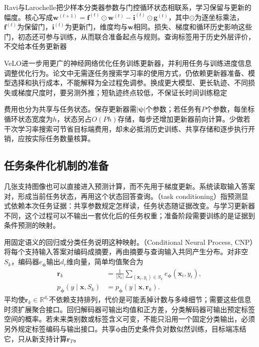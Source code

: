 Ravi与Larochelle把少样本分类器参数与门控循环状态相联系，学习保留与更新的幅度。核心写成$\bm w^{(t+1)}=\bm f^{(t)}\odot\bm w^{(t)}-\bm i^{(t)}\odot\bm g^{(t)}$，其中$\odot$为逐坐标乘法，$\bm f^{(t)}$为保留门，$\bm i^{(t)}$为更新门，维度均与$\bm w$相同。损失、梯度和循环历史影响这些门，初态还可参与训练，从而联合准备起点与规则。查询标签用于历史外层评价，不交给本任务更新器

VeLO进一步用更广的神经网络优化任务训练更新器，并利用任务与训练进度信息调整优化行为。论文中无需逐任务搜索学习率的使用方式，仍依赖更新器准备、模型选择和执行成本，不能解释为全过程免调参。换成更大模型、更长轨迹、不同损失或梯度尺度时，要另测外推；短轨迹终点较低，不保证长时间训练稳定

费用也分为共享与任务状态。保存更新器需$|\bm\psi|$个参数；若任务有$P$个参数，每坐标循环状态宽度为$h$，状态另占$O(Ph)$存储，每步还增加更新器前向计算。少做若干次学习率搜索可节省目标端费用，却未必抵消历史训练、共享存储和逐步执行开销，应按实际任务数量核算。

\subsection{任务条件化机制的准备}
\label{sec:ket-transfer-conditioning-preparation}

几张支持图像也可以直接进入预测计算，而不先用于梯度更新。系统读取输入答案对，形成当前任务状态，再用这个状态回答查询。（task conditioning）指预测显式依赖本次任务证据：共享参数规定怎样读，任务状态随证据改变。与学习更新器不同，这个过程可以不输出一套优化后的任务权重；准备阶段需要训练的是证据到条件预测的映射。

用固定语义的回归或分类任务说明这种映射。（Conditional Neural Process, CNP）将每个支持输入答案对编码成摘要，再由摘要与查询输入共同产生分布。对非空$S_k$，编码器$e_{\bm\phi}$输出$d_r$维向量，简单均值聚合为
\begin{align}
  \bm r_k&=\frac1{|S_k|}\sum_{(\bm x_i,y_i)\in S_k}
                   e_{\bm\phi}(\bm x_i,y_i), \nonumber\\
  p_{\bm\phi}(y\mid\bm x,S_k)
      &=p_{\bm\phi}(y\mid\bm x,\bm r_k).
  \label{eq:ket-transfer-cnp}
\end{align}
平均使$\bm r_k\in\mathbb R^{d_r}$不依赖支持排列，代价是可能丢掉计数与多峰细节；需要这些信息时须扩展聚合接口。回归解码器可输出均值和正方差，分类解码器可输出预定标签空间的概率。若未来类别数或标签含义可变，不能只沿用一个固定分类输出，必须另外规定标签编码与输出接口。共享$\bm\phi$由历史条件负对数似然训练，目标端冻结它，只从新支持计算$\bm r_T$。

